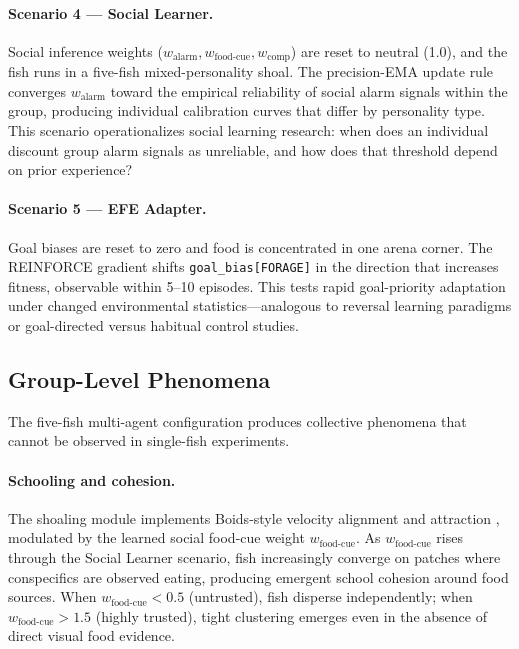 \documentclass[12pt]{article}
\begin{document}
\paragraph{Scenario 4 --- Social Learner.}
Social inference weights ($w_\text{alarm}, w_{\text{food-cue}},
w_{\text{comp}}$) are reset to neutral (1.0), and the fish runs in a
five-fish mixed-personality shoal.
The precision-EMA update rule converges $w_\text{alarm}$ toward the
empirical reliability of social alarm signals within the group, producing
individual calibration curves that differ by personality type.
This scenario operationalizes social learning research: when does an
individual discount group alarm signals as unreliable, and how does that
threshold depend on prior experience?

\paragraph{Scenario 5 --- EFE Adapter.}
Goal biases are reset to zero and food is concentrated in one arena corner.
The REINFORCE gradient shifts \texttt{goal\_bias[FORAGE]} in the direction
that increases fitness, observable within 5--10 episodes.
This tests rapid goal-priority adaptation under changed environmental
statistics---analogous to reversal learning paradigms or goal-directed
versus habitual control studies.

\subsection{Group-Level Phenomena}

The five-fish multi-agent configuration produces collective phenomena that
cannot be observed in single-fish experiments.

\paragraph{Schooling and cohesion.}
The shoaling module implements Boids-style velocity alignment and attraction
\citep{reynolds1987}, modulated by the learned social food-cue weight
$w_{\text{food-cue}}$.
As $w_{\text{food-cue}}$ rises through the Social Learner scenario,
fish increasingly converge on patches where conspecifics are observed
eating, producing emergent school cohesion around food sources.
When $w_{\text{food-cue}} < 0.5$ (untrusted), fish disperse independently;
when $w_{\text{food-cue}} > 1.5$ (highly trusted), tight clustering emerges
even in the absence of direct visual food evidence.
\end{document}
